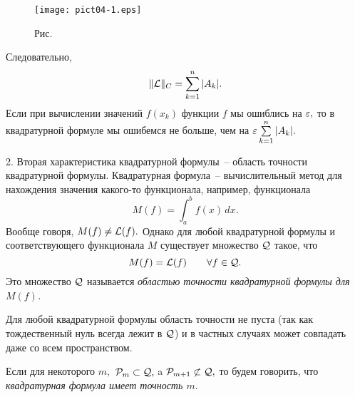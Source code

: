 


  \bigskip
\begin{figure}[ht]
\begin{center}
\texttt{[image: pict04-1.eps]}
\end{center}
 \bigskip
 \label{r4-1}

 \centerline{Рис.~\theris}
 \bigskip
\end{figure}





\noindent Следовательно,
\[
 \|\mathcal{L} \|_C=\sum\limits_{k=1}^n |A_k|.
\]
Если при вычислении значений $f(x_k)$ функции $f$
мы ошиблись на ${\varepsilon },$ то в квадратурной формуле мы ошибемся
не больше, чем на ${\varepsilon } \sum\limits_{k=1}^n |A_k|.$

2. Вторая характеристика квадратурной формулы~-- область
точности квадратурной формулы.
Квадратурная формула~-- вычислительный метод для
нахождения значения какого-то функционала, например, функционала
\[
  M(f)=\int_a^b f(x) \,dx.
\]
Вообще говоря, $M(f) \ne \mathcal{L}(f).$
Однако для любой квадратурной формулы и соответствующего
функционала $M$ существует множество
$\mathcal{Q}$ такое, что
\[
  M(f) = \mathcal{L}(f) \qquad \forall f \in \mathcal{Q}.
\]
Это множество $\mathcal{Q}$ называется {\it областью точности квадратурной формулы для
$M(f)$.}

Для любой квадратурной формулы область точности не
пуста (так как тождественный нуль всегда лежит в
$\mathcal{Q}$) и в частных случаях может совпадать даже со всем пространством.

\begin{defi}
Если для некоторого $m,$ $\mathcal{P}_m \subset \mathcal{Q},$ {a $\mathcal{P}_{m+1}\not\subset \mathcal{Q},$} то будем говорить, что {\it
квадратурная формула имеет точность $m.$}
\end{defi}

